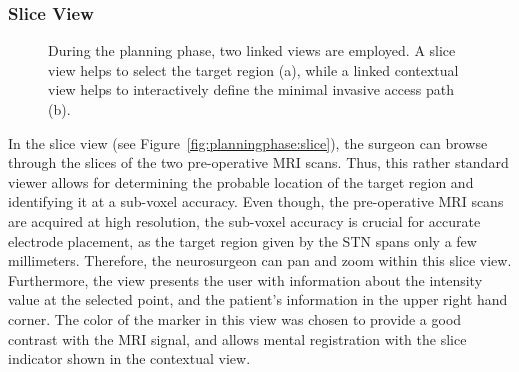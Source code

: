 \documentclass{vgtc}                          %
\begin{document}
\subsubsection{Slice View}\label{sec:overview:planning:slice}

\begin{figure}
    \centering    
    \caption{During the planning phase, two linked views are employed. A slice view helps to select the target region (a), while a linked contextual view helps to interactively define the minimal invasive access path (b).}
    \label{fig:planningphase:view}
\end{figure}

In the slice view (see Figure~\ref{fig:planningphase:slice}), the surgeon can browse through the slices of the two pre-operative MRI scans. Thus, this rather standard viewer allows for determining the probable location of the target region and identifying it at a sub-voxel accuracy. Even though, the pre-operative MRI scans are acquired at high resolution, the sub-voxel accuracy is crucial for accurate electrode placement, as the target region given by the STN spans only a few millimeters. Therefore, the neurosurgeon can pan and zoom within this slice view. Furthermore, the view presents the user with information about the intensity value at the selected point, and the patient's information in the upper right hand corner. The color of the marker in this view was chosen to provide a good contrast with the MRI signal, and allows mental registration with the slice indicator shown in the contextual view.
\end{document}
